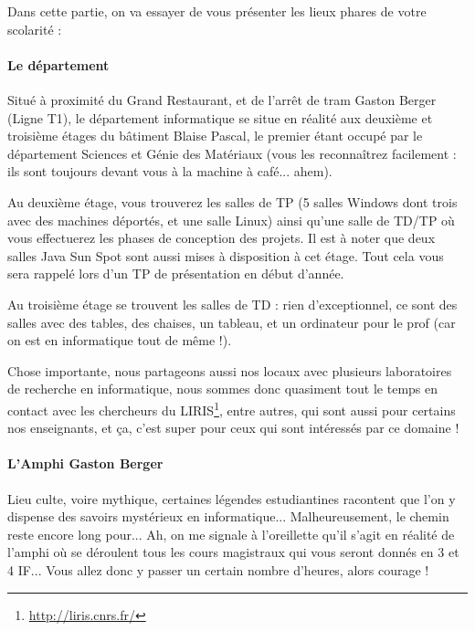 Dans cette partie, on va essayer de vous présenter les lieux phares de votre scolarité : 

\paragraph{Le département}
Situé à proximité du Grand Restaurant, et de l'arrêt de tram Gaston Berger
(Ligne T1), le département informatique se situe en réalité aux deuxième et
troisième étages du bâtiment Blaise Pascal, le premier étant occupé par le
département Sciences et Génie des Matériaux (vous les reconnaîtrez facilement :
ils sont toujours devant vous à la machine à café... ahem).

\vspace{1em}

Au deuxième étage, vous trouverez les salles de TP (5 salles Windows dont trois
avec des machines déportés, et une salle Linux) ainsi qu'une salle de
TD/TP où vous effectuerez les phases de conception des projets. Il est à noter que deux
salles Java Sun Spot sont aussi mises à disposition à cet étage. Tout
cela vous sera rappelé lors d'un TP de présentation en début d'année.

\vspace{1em}

Au troisième étage se trouvent les salles de TD : rien d'exceptionnel, ce sont
des salles avec des tables, des chaises, un tableau, et un ordinateur pour le
prof (car on est en informatique tout de même !).

\vspace{1em}

Chose importante, nous partageons aussi nos locaux avec plusieurs laboratoires
de recherche en informatique, nous sommes donc quasiment tout le temps en
contact avec les chercheurs du LIRIS\footnote{\url{http://liris.cnrs.fr/}}, entre autres, qui sont aussi pour certains
nos enseignants, et ça, c'est super pour ceux qui sont intéressés par ce domaine !

\paragraph{L'Amphi Gaston Berger}
Lieu culte, voire mythique, certaines légendes estudiantines racontent que l'on
y dispense des savoirs mystérieux en informatique... Malheureusement, le chemin reste
encore long pour... Ah, on me signale à l'oreillette qu'il s'agit en réalité de l'amphi où se
déroulent tous les cours magistraux qui vous seront donnés en 3 et 4 IF... Vous
allez donc y passer un certain nombre d'heures, alors courage ! 

